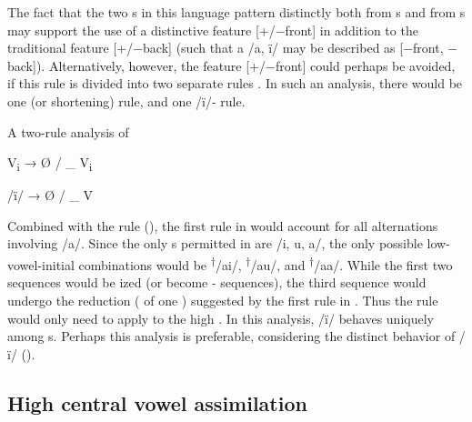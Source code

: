   The fact that the two s in this language pattern distinctly both from s and from s may support the use of a distinctive feature [+/$-$front] in addition to the traditional feature [+/$-$back] (such that a  /a, ï/ may be described as [$-$front, $-$back]). Alternatively, however, the feature [+/$-$front] could perhaps be avoided, if this rule is divided into two separate rules . In such an analysis, there would be one   (or shortening) rule, and one /ï/- rule.

\ea%
    \label{ex:phon:76}
          A two-rule analysis of  

    \ea  V\textsubscript{i} → Ø / \_ V\textsubscript{i}

    \ex  /ï/ → Ø / \_ V
    \z
\z

Combined with the  rule (), the first rule in  would account for all alternations involving /a/. Since the only s permitted in  are /i, u, a/, the only possible  low-vowel-initial  combinations would be \textsuperscript{†}/ai/, \textsuperscript{†}/au/, and \textsuperscript{†}/aa/. While the first two sequences would be ized (or become - sequences), the third sequence would undergo the reduction ( of one ) suggested by the first rule in . Thus the   rule would only need to apply to the high . In this analysis, /ï/ behaves uniquely among s. Perhaps this analysis is preferable, considering the distinct behavior of /ï/ ().




\subsection{High central vowel assimilation}\label{sec:2.5.6}


